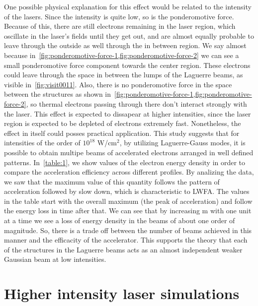 \documentclass[12pt, class=report, crop=false]{standalone}
\begin{document}
One possible physical explanation for this effect would be related to the intensity of the lasers. Since the intensity is quite low, so is the ponderomotive force. Because of this, there are still electrons remaining in the laser region, which oscillate in the laser's fields until they get out, and are almost equally probable to leave through the outside as well through the in between region. We say almost because in~\cref{fig:ponderomotive-force-1,fig:ponderomotive-force-2} we can see a small ponderomotive force component towards the center region. These electrons could leave through the space in between the lumps of the Laguerre beams, as visible in~\cref{fig:visit0011}. Also, there is no ponderomotive force in the space between the structures as shown in~\cref{fig:ponderomotive-force-1,fig:ponderomotive-force-2}, so thermal electrons passing through there don't interact strongly with the laser. This effect is expected to dissapear at higher intensities, since the laser region is expected to be depleted of electrons extremely fast. Nonetheless, the effect in itself could posses practical application. This study suggests that for intensities of the order of $10^{18}$ W/cm$^2$, by utilizing Laguerre-Gauss modes, it is possible to obtain multipe beams of accelerated electrons arranged in well defined patterns. In~\cref{table:1}, we show values of the electron energy density in order to compare the acceleration efficiency across different profiles. By analizing the data, we saw that the maximum value of this quantity follows the pattern of acceleration followed by slow down, which is characteristic to LWFA. The values in the table start with the overall maximum (the peak of acceleration) and follow the energy loss in time after that. We can see that by increasing m with one unit at a time we see a loss of energy density in the beams of about one order of magnitude. So, there is a trade off between the number of beams achieved in this manner and the efficacity of the accelerator. This supports the theory that each of the structures in the Laguerre beams acts as an almost independent weaker Gaussian beam at low intensities.

\section{Higher intensity laser simulations}
\end{document}
